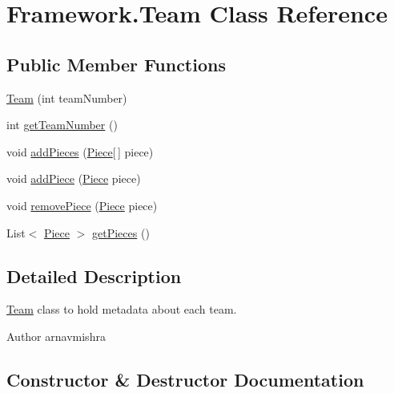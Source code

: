 \hypertarget{class_framework_1_1_team}{}\section{Framework.\+Team Class Reference}
\label{class_framework_1_1_team}
\subsection*{Public Member Functions}
\begin{DoxyCompactItemize}
\item 
\hyperlink{class_framework_1_1_team_a4601e02742a7835d49c86969760073fd}{Team} (int team\+Number)
\item 
int \hyperlink{class_framework_1_1_team_a9636e5f189027878b25dcc03ece740e5}{get\+Team\+Number} ()
\item 
void \hyperlink{class_framework_1_1_team_a7bff66a597d19c0b3e528ddcbec1cb2f}{add\+Pieces} (\hyperlink{class_framework_1_1_pieces_1_1_piece}{Piece}\mbox{[}$\,$\mbox{]} piece)
\item 
void \hyperlink{class_framework_1_1_team_a0bc8fa20d6f085f3d85679f1d1e3c203}{add\+Piece} (\hyperlink{class_framework_1_1_pieces_1_1_piece}{Piece} piece)
\item 
void \hyperlink{class_framework_1_1_team_abe658d4774a4db816c46a4aa504bfd03}{remove\+Piece} (\hyperlink{class_framework_1_1_pieces_1_1_piece}{Piece} piece)
\item 
List$<$ \hyperlink{class_framework_1_1_pieces_1_1_piece}{Piece} $>$ \hyperlink{class_framework_1_1_team_a67366067e09cfa957a8745ebf894aa62}{get\+Pieces} ()
\end{DoxyCompactItemize}


\subsection{Detailed Description}
\hyperlink{class_framework_1_1_team}{Team} class to hold metadata about each team. \begin{DoxyAuthor}{Author}
arnavmishra 
\end{DoxyAuthor}


\subsection{Constructor \& Destructor Documentation}
\hypertarget{class_framework_1_1_team_a4601e02742a7835d49c86969760073fd}{}\label{class_framework_1_1_team_a4601e02742a7835d49c86969760073fd} 
